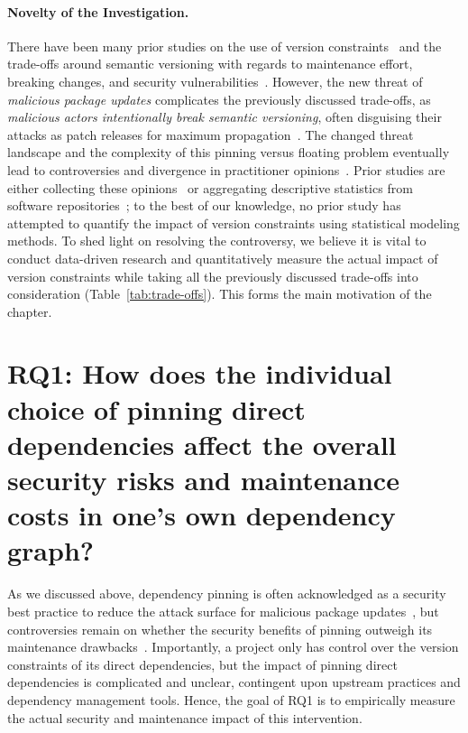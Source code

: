 \paragraph{Novelty of the Investigation.}
There have been many prior studies on the use of version constraints~\cite{DBLP:conf/msr/0001PSTB19, DBLP:journals/tse/DecanM21, DBLP:conf/msr/PinckneyCGB23, DBLP:conf/sp/LadisaPMB23} and the trade-offs around semantic versioning with regards to maintenance effort, breaking changes, and security vulnerabilities~\cite{DBLP:journals/tse/JafariCAST22, DBLP:journals/tosem/BogartKHT21,DBLP:journals/jss/RaemaekersDV17}.
However, the new threat of \textit{malicious package updates} complicates the previously discussed trade-offs, as \emph{malicious actors intentionally break semantic versioning}, often disguising their attacks as patch releases for maximum propagation~\cite{node-ipc}.
The changed threat landscape and the complexity of this pinning versus floating problem eventually lead to controversies and divergence in practitioner opinions~\cite{facts-vs-feelings, renovate-pinning, pinning-only-work, DBLP:conf/sp/LadisaPMB23, DBLP:journals/tse/JafariCAST22}.
Prior studies are either collecting these opinions~\cite{DBLP:journals/tosem/BogartKHT21, DBLP:journals/tse/JafariCAST22, DBLP:conf/sp/LadisaPMB23} or aggregating descriptive statistics from software repositories~\cite{DBLP:conf/msr/0001PSTB19, DBLP:conf/msr/PinckneyCGB23, DBLP:journals/tse/DecanM21, DBLP:journals/jss/RaemaekersDV17}; to the best of our knowledge, no prior study has attempted to quantify the impact of version constraints using statistical modeling methods.
To shed light on resolving the controversy, we believe it is vital to conduct data-driven research and quantitatively measure the actual impact of version constraints while taking all the previously discussed trade-offs into consideration (Table~\ref{tab:trade-offs}).
This forms the main motivation of the chapter.

\section{RQ1: How does the individual choice of pinning direct dependencies affect the overall security risks and maintenance costs in one's own dependency graph?}

As we discussed above, dependency pinning is often acknowledged as a security best practice to reduce the attack surface for malicious package updates~\cite{DBLP:conf/sp/LadisaPMB23, DBLP:journals/ieeesp/ZahanKHSW23}, but controversies remain on whether the security benefits of pinning outweigh its maintenance drawbacks~\cite{facts-vs-feelings, renovate-pinning, pinning-only-work, DBLP:conf/sp/LadisaPMB23, DBLP:journals/tse/JafariCAST22}.
Importantly, a project only has control over the version constraints of its direct dependencies, but the impact of pinning direct dependencies is complicated and unclear, contingent upon upstream practices and dependency management tools.
Hence, the goal of RQ1 is to empirically measure the actual security and maintenance impact of this intervention.

